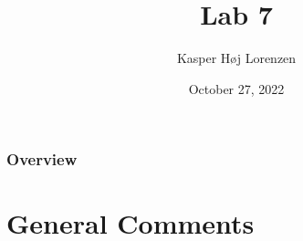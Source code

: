 \documentclass{beamer}
\title[Lab 7]{Lab 7} %
\author{Kasper Høj Lorenzen} %
\institute[SDU Robotics] %
{
University of Southern Denmark \\ %
\medskip
\textit{kalor@mmmi.sdu.dk} %
}
\date{October 27, 2022} %
\begin{document}
\begin{frame}
\titlepage %
\end{frame}

\begin{frame}
\frametitle{Overview} %
\tableofcontents %
\end{frame}


\section{General Comments}
\end{document}
